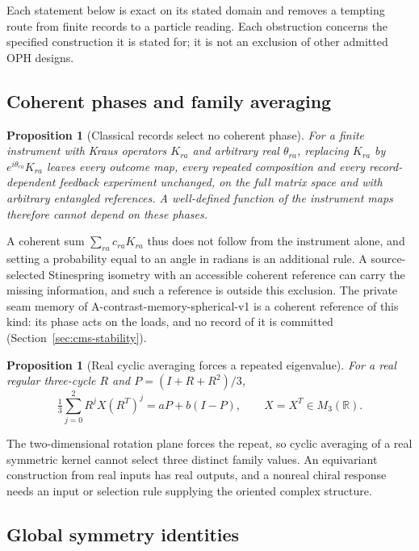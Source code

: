 \documentclass[11pt]{article}
\newtheorem{proposition}[theorem]{Proposition}
\begin{document}
Each statement below is exact on its stated domain and removes a tempting route
from finite records to a particle reading. Each obstruction concerns the
specified construction it is stated for; it is not an exclusion of other admitted
OPH designs.

\subsection{Coherent phases and family averaging}

\begin{proposition}[Classical records select no coherent phase]
For a finite instrument with Kraus operators $K_{ra}$ and arbitrary real $\theta_{ra}$,
replacing $K_{ra}$ by $e^{i\theta_{ra}}K_{ra}$ leaves every outcome map, every repeated
composition and every record-dependent feedback experiment unchanged, on the full matrix
space and with arbitrary entangled references. A well-defined function of the instrument
maps therefore cannot depend on these phases.
\end{proposition}

A coherent sum $\sum_{ra}c_{ra}K_{ra}$ thus does not follow from the instrument alone, and
setting a probability equal to an angle in radians is an additional rule. A
source-selected Stinespring isometry with an accessible coherent reference can carry the
missing information, and such a reference is outside this exclusion. The private seam
memory of A-contrast-memory-spherical-v1 is a coherent reference of this kind: its phase acts on the
loads, and no record of it is committed (Section~\ref{sec:cms-stability}).

\begin{proposition}[Real cyclic averaging forces a repeated eigenvalue]
For a real regular three-cycle $R$ and $P=(I+R+R^2)/3$,
\[
\tfrac13\sum_{j=0}^{2}R^jX(R^T)^j=aP+b(I-P),\qquad X=X^T\in M_3(\mathbb R).
\]
\end{proposition}

The two-dimensional rotation plane forces the repeat, so cyclic averaging of a real
symmetric kernel cannot select three distinct family values. An equivariant construction
from real inputs has real outputs, and a nonreal chiral response needs an input or selection
rule supplying the oriented complex structure.

\subsection{Global symmetry identities}
\end{document}

